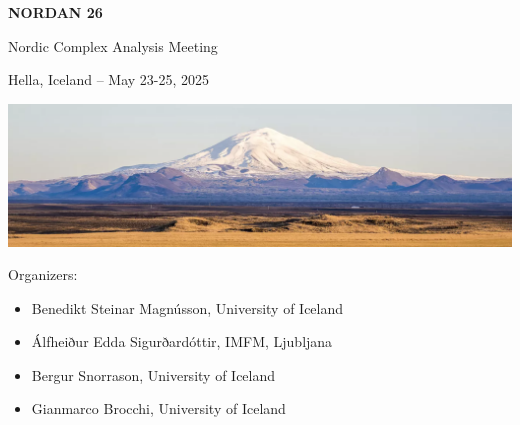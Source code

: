 \documentclass[12pt,openany]{report}      %
\def\TITLE{NORDAN 26}
\def\SUBTITLE{Nordic Complex Analysis Meeting}
\def\LOCATION{Hella, Iceland -- May 23-25, 2025}
\begin{document}
\begin{titlepage}
	\centering
    {\textbf{\textsf{\fontsize{63}{18}\selectfont \TITLE}}\par}
	\vspace{0.5cm}
	{\Huge \textsf{\SUBTITLE}\par}
	\vspace{0.5cm}
	{\Large \LOCATION\par}
	\vspace{2cm}
	\vfill
    \includegraphics[width=1\textwidth]{figs/cover}\par\vspace{1cm}
\end{titlepage}

\newpage
\begin{center} 
    \noindent{}
\end{center}
    
\vfill

Organizers:
\begin{itemize}
    \item Benedikt Steinar Magnússon, University of Iceland
    \item Álfheiður Edda Sigurðardóttir, IMFM, Ljubljana
    \item Bergur Snorrason, University of Iceland
    \item Gianmarco Brocchi, University of Iceland
\end{itemize}

\newcommand\talk[3]{%
    \vspace{3 ex}
    \noindent
    \textsc{\large #1}

    \smallskip
    \noindent
    \textbf{\textit{#2}}

    \medskip
    \noindent
    #3

}




\pagebreak



\pagebreak



\restoregeometry
\end{document}
